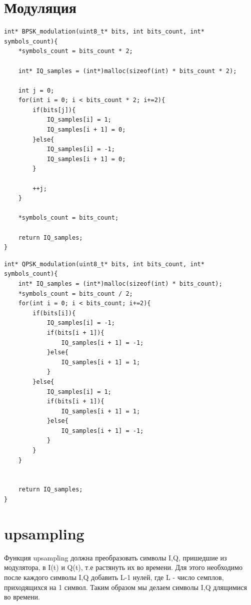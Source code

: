 \section{Модуляция}

\begin{lstlisting}
int* BPSK_modulation(uint8_t* bits, int bits_count, int* symbols_count){
    *symbols_count = bits_count * 2;

    int* IQ_samples = (int*)malloc(sizeof(int) * bits_count * 2);
    
    int j = 0;
    for(int i = 0; i < bits_count * 2; i+=2){
        if(bits[j]){
            IQ_samples[i] = 1;
            IQ_samples[i + 1] = 0;
        }else{
            IQ_samples[i] = -1;
            IQ_samples[i + 1] = 0;
        }

        ++j;
    }

    *symbols_count = bits_count;

    return IQ_samples;
}
\end{lstlisting}

\begin{lstlisting}
int* QPSK_modulation(uint8_t* bits, int bits_count, int* symbols_count){
    int* IQ_samples = (int*)malloc(sizeof(int) * bits_count);
    *symbols_count = bits_count / 2;
    for(int i = 0; i < bits_count; i+=2){
        if(bits[i]){
            IQ_samples[i] = -1;
            if(bits[i + 1]){
                IQ_samples[i + 1] = -1;
            }else{
                IQ_samples[i + 1] = 1;
            }
        }else{
            IQ_samples[i] = 1;
            if(bits[i + 1]){
                IQ_samples[i + 1] = 1;
            }else{
                IQ_samples[i + 1] = -1;
            }
        }
    }


    return IQ_samples;
}
\end{lstlisting}

\section{upsampling}

Функция upsampling должна преобразовать символы I,Q, пришедшие из модулятора, в I(t) и Q(t), т.е растянуть их во времени. Для этого
необходимо после каждого символы I,Q добавить L-1 нулей, где L - число семплов, приходящихся на 1 символ. Таким образом мы делаем символы
I,Q длящимися во времени.

